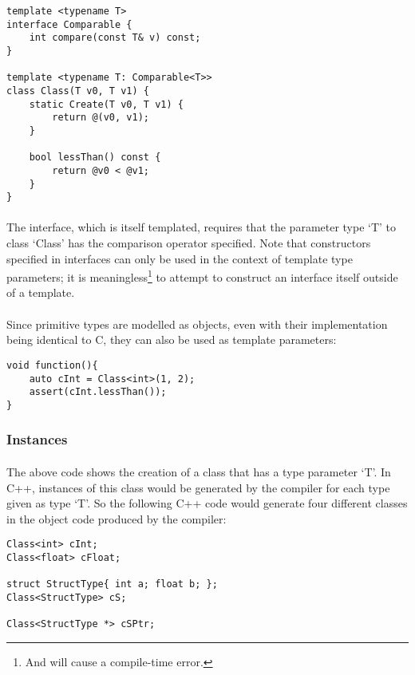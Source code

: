 \documentclass[12pt,twoside,notitlepage]{report}
\begin{document}
\begin{lstlisting}
template <typename T>
interface Comparable {
	int compare(const T& v) const;
}

template <typename T: Comparable<T>>
class Class(T v0, T v1) {
	static Create(T v0, T v1) {
		return @(v0, v1);
	}
	
	bool lessThan() const {
		return @v0 < @v1;
	}
}
\end{lstlisting}

\paragraph{}
The interface, which is itself templated, requires that the parameter type `T' to class `Class' has the comparison operator specified. Note that constructors specified in interfaces can only be used in the context of template type parameters; it is meaningless\footnote{And will cause a compile-time error.} to attempt to construct an interface itself outside of a template.

\paragraph{}
Since primitive types are modelled as objects, even with their implementation being identical to C, they can also be used as template parameters:

\begin{lstlisting}
void function(){
	auto cInt = Class<int>(1, 2);
	assert(cInt.lessThan());
}
\end{lstlisting}

\subsubsection{Instances}

\paragraph{}
The above code shows the creation of a class that has a type parameter `T'. In C++, instances of this class would be generated by the compiler for each type given as type `T'. So the following C++ code would generate four different classes in the object code produced by the compiler:

\begin{lstlisting}
Class<int> cInt;
Class<float> cFloat;

struct StructType{ int a; float b; };
Class<StructType> cS;

Class<StructType *> cSPtr;
\end{lstlisting}
\end{document}
